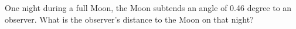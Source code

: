 One night during a full Moon, the Moon subtends an angle of 0.46 degree to an
observer. What is the observer's distance to the Moon on that night?
